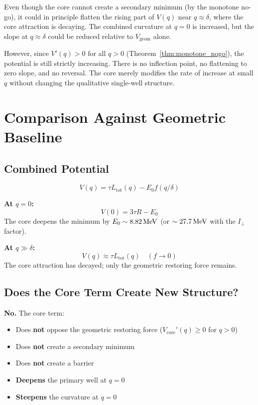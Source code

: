 Even though the core cannot create a secondary minimum (by the monotone
no-go), it could in principle flatten the rising part of $V(q)$ near
$q \approx \delta$, where the core attraction is decaying. The
combined curvature at $q = 0$ is increased, but the slope at
$q \approx \delta$ could be reduced relative to $V_{\mathrm{geom}}$
alone.

However, since $V'(q) > 0$ for all $q > 0$ (Theorem~\ref{thm:monotone_nogo}),
the potential is still strictly increasing. There is no inflection
point, no flattening to zero slope, and no reversal. The core merely
modifies the rate of increase at small $q$ without changing the
qualitative single-well structure.

\section{Comparison Against Geometric Baseline}
\label{sec:P2N7:comparison}

\subsection{Combined Potential}

\begin{equation}
    V(q) = \tau L_{\mathrm{tot}}(q) - E_0 f(q/\delta)
    \label{eq:N7_Vtotal}
\end{equation}

\textbf{At $q = 0$:}
\begin{equation}
    V(0) = 3\tau R - E_0
    \label{eq:N7_V0}
\end{equation}
The core deepens the minimum by $E_0 \sim 8.82\,\mathrm{MeV}$ (or
$\sim 27.7\,\mathrm{MeV}$ with the $I_\perp$ factor).

\textbf{At $q \gg \delta$:}
\begin{equation}
    V(q) \approx \tau L_{\mathrm{tot}}(q)
    \quad (f \to 0)
    \label{eq:N7_Vlarge}
\end{equation}
The core attraction has decayed; only the geometric restoring force
remains.

\subsection{Does the Core Term Create New Structure?}

\textbf{No.} The core term:
\begin{itemize}
    \item Does \textbf{not} oppose the geometric restoring force
          ($V_{\mathrm{core}}'(q) \geq 0$ for $q > 0$)
    \item Does \textbf{not} create a secondary minimum
    \item Does \textbf{not} create a barrier
    \item \textbf{Deepens} the primary well at $q = 0$
    \item \textbf{Steepens} the curvature at $q = 0$
\end{itemize}

